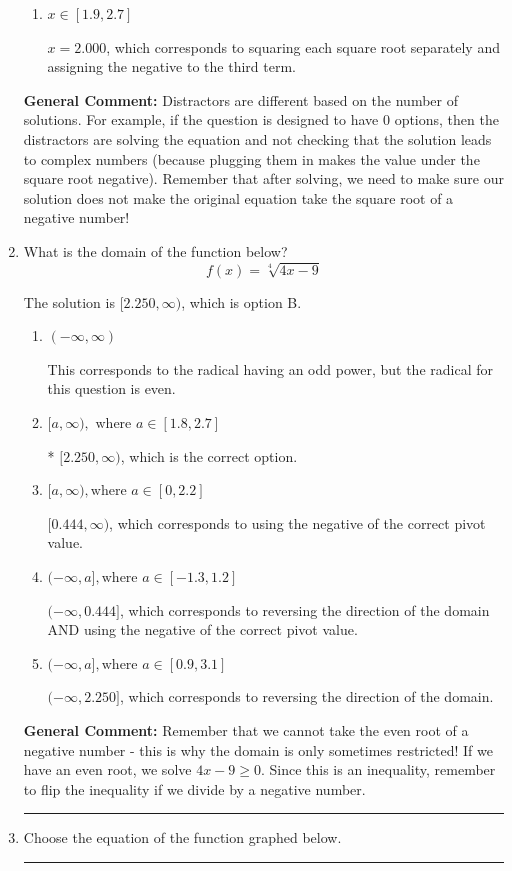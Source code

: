 \documentclass{extbook}[14pt]
\newcommand{\litem}[1]{\item #1

\rule{\textwidth}{0.4pt}}
\begin{document}
\begin{enumerate}
{\begin{enumerate}[label=\Alph*.]
$x = -1.000$ and $x = 1.750$, which corresponds to solving each radical separately for 0.
\item \( x \in [1.9,2.7] \)

$x = 2.000$, which corresponds to squaring each square root separately and assigning the negative to the third term.
\end{enumerate}

\textbf{General Comment:} Distractors are different based on the number of solutions. For example, if the question is designed to have 0 options, then the distractors are solving the equation and not checking that the solution leads to complex numbers (because plugging them in makes the value under the square root negative). Remember that after solving, we need to make sure our solution does not make the original equation take the square root of a negative number!
}
\litem{
What is the domain of the function below?
\[ f(x) = \sqrt[4]{4 x - 9} \]

The solution is \( [2.250, \infty) \), which is option B.\begin{enumerate}[label=\Alph*.]
\item \( (-\infty, \infty) \)

This corresponds to the radical having an odd power, but the radical for this question is even.
\item \( [a, \infty), \text{ where } a \in [1.8, 2.7] \)

* $[2.250, \infty)$, which is the correct option.
\item \( [a, \infty), \text{where } a \in [0, 2.2] \)

$[0.444, \infty)$, which corresponds to using the negative of the correct pivot value.
\item \( (-\infty, a], \text{where } a \in [-1.3, 1.2] \)

$(-\infty, 0.444]$, which corresponds to reversing the direction of the domain AND using the negative of the correct pivot value.
\item \( (-\infty, a], \text{where } a \in [0.9, 3.1] \)

 $(-\infty, 2.250]$, which corresponds to reversing the direction of the domain.
\end{enumerate}

\textbf{General Comment:} Remember that we cannot take the even root of a negative number - this is why the domain is only sometimes restricted! If we have an even root, we solve $4 x - 9 \geq 0$. Since this is an inequality, remember to flip the inequality if we divide by a negative number.
}
\litem{
Choose the equation of the function graphed below.

}
\end{enumerate}
\end{document}
